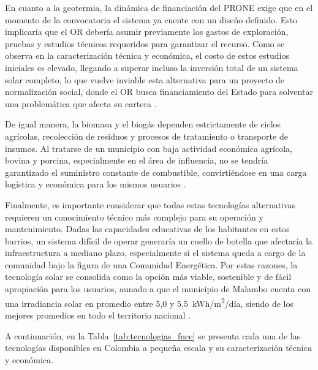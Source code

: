En cuanto a la geotermia, la dinámica de financiación del PRONE exige que en el momento de la convocatoria el sistema ya cuente con un diseño definido. Esto implicaría que el OR debería asumir previamente los gastos de exploración, pruebas y estudios técnicos requeridos para garantizar el recurso. Como se observa en la caracterización técnica y económica, el costo de estos estudios iniciales es elevado, llegando a superar incluso la inversión total de un sistema solar completo, lo que vuelve inviable esta alternativa para un proyecto de normalización social, donde el OR busca financiamiento del Estado para solventar una problemática que afecta su cartera \parencite{UPMECatalogoTecnologico2024}.

De igual manera, la biomasa y el biogás dependen estrictamente de ciclos agrícolas, recolección de residuos y procesos de tratamiento o transporte de insumos. Al tratarse de un municipio con baja actividad económica agrícola, bovina y porcina, especialmente en el área de influencia, no se tendría garantizado el suministro constante de combustible, convirtiéndose en una carga logística y económica para los mismos usuarios \parencite{UPMECatalogoTecnologico2024}.

Finalmente, es importante considerar que todas estas tecnologías alternativas requieren un conocimiento técnico más complejo para su operación y mantenimiento. Dadas las capacidades educativas de los habitantes en estos barrios, un sistema difícil de operar generaría un cuello de botella que afectaría la infraestructura a mediano plazo, especialmente si el sistema queda a cargo de la comunidad bajo la figura de una Comunidad Energética. Por estas razones, la tecnología solar se consolida como la opción más viable, sostenible y de fácil apropiación para los usuarios, aunado a que el municipio de Malambo cuenta con una irradiancia solar en promedio entre 5,0 y 5,5~kWh/m\textsuperscript{2}/día, siendo de los mejores promedios en todo el territorio nacional \parencite{UPMECatalogoTecnologico2024}.

A continuación, en la Tabla~\ref{tab:tecnologias_fnce} se presenta cada una de las tecnologías disponibles en Colombia a pequeña escala y su caracterización técnica y económica.

